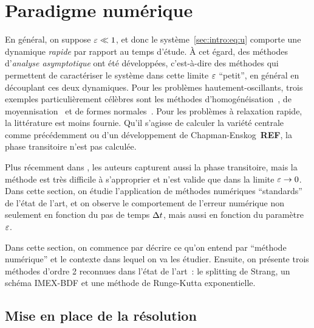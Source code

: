 \section*{Paradigme numérique}

En général, on suppose $\varepsilon \ll 1$, et donc le système~\eqref{sec:intro:eq:u} comporte une dynamique \textit{rapide} par rapport au temps d'étude. À cet égard, des méthodes d'\textit{analyse asymptotique} ont été développées, c'est-à-dire des méthodes qui permettent de caractériser le système dans cette limite $\varepsilon$ \enquote{petit}, en général en découplant ces deux dynamiques. Pour les problèmes hautement-oscillants, trois exemples particulièrement célèbres sont les méthodes d'homogénéisation~\cite{goudon.2003.homogenization}, de moyennisation~\cite{perko.1969.higher,sanders.2007.averaging,lochak.1988.multiphase} et de formes normales~\cite{murdock.2006.normal,bambusi.2003.birkhoff}. Pour les problèmes à relaxation rapide, la littérature est moins fournie. Qu'il s'agisse de calculer la variété centrale comme précédemment ou d'un développement de Chapman-Enskog~\textbf{REF}, la phase transitoire n'est pas calculée. 

Plus récemment dans \cite{castella.2016.formal}, les auteurs capturent aussi la phase transitoire, mais la méthode est très difficile à s'approprier et n'est valide que dans la limite $\varepsilon \rightarrow 0$. Dans cette section, on étudie l'application de méthodes numériques \enquote{standards} de l'état de l'art, et on observe le comportement de l'erreur numérique non seulement en fonction du pas de temps $\Delta t$, mais aussi en fonction du paramètre $\varepsilon$. 

Dans cette section, on commence par décrire ce qu'on entend par \enquote{méthode numérique} et le contexte dans lequel on va les étudier. Ensuite, on présente trois méthodes d'ordre 2 reconnues dans l'état de l'art~: le splitting de Strang, un schéma IMEX-BDF et une méthode de Runge-Kutta exponentielle. 



\subsection*{Mise en place de la résolution}

